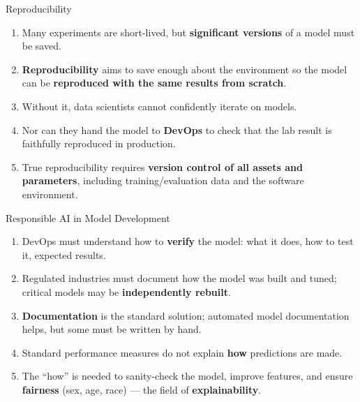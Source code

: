 \begin{frame}{Reproducibility}
\begin{enumerate}
\item<1-> Many experiments are short-lived, but \textbf{significant versions} of a model must be saved.
\item<2-> \textbf{Reproducibility} aims to save enough about the environment so the model can be \textbf{reproduced with the same results from scratch}.
\item<3-> Without it, data scientists cannot confidently iterate on models.
\item<4-> Nor can they hand the model to \textbf{DevOps} to check that the lab result is faithfully reproduced in production.
\item<5-> True reproducibility requires \textbf{version control of all assets and parameters}, including training/evaluation data and the software environment.
\end{enumerate}
\end{frame}

\begin{frame}{Responsible AI in Model Development}
\begin{enumerate}
\item<1-> DevOps must understand how to \textbf{verify} the model: what it does, how to test it, expected results.
\item<2-> Regulated industries must document how the model was built and tuned; critical models may be \textbf{independently rebuilt}.
\item<3-> \textbf{Documentation} is the standard solution; automated model documentation helps, but some must be written by hand.
\item<4-> Standard performance measures do not explain \textbf{how} predictions are made.
\item<5-> The ``how'' is needed to sanity-check the model, improve features, and ensure \textbf{fairness} (sex, age, race) --- the field of \textbf{explainability}.
\end{enumerate}
\end{frame}

